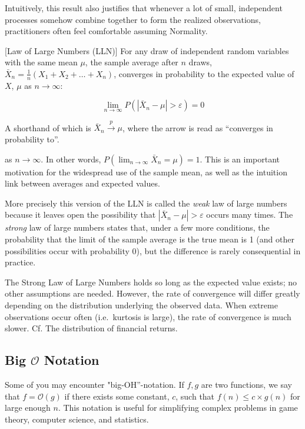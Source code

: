 \documentclass[]{book}
\theoremstyle{definition}
\theoremstyle{definition}
\theoremstyle{definition}
\theoremstyle{remark}
\begin{document}
Intuitively, this result also justifies that whenever a lot of small, independent processes somehow combine together to form the realized observations, practitioners often feel comfortable assuming Normality.

[Law of Large Numbers (LLN)]
\protect\hypertarget{thm:lln}{}{\label{thm:lln} {} }For any draw of independent random variables with the same mean \(\mu\), the sample average after \(n\) draws, \(\bar{X}_n = \frac{1}{n}(X_1 + X_2 + \ldots + X_n)\), converges in probability to the expected value of \(X\), \(\mu\) as \(n \rightarrow \infty\):

\[\lim\limits_{n\to \infty} P(|\bar{X}_n - \mu | > \varepsilon) = 0\]

A shorthand of which is \(\bar{X}_n \xrightarrow{p} \mu\), where the arrow is read as ``converges in probability to''.

as \(n\to \infty\). In other words, \(P( \lim_{n\to\infty}\bar{X}_n = \mu) = 1\). This is an important motivation for the widespread use of the sample mean, as well as the intuition link between averages and expected values.

More precisely this version of the LLN is called the \emph{weak} law of large numbers because it leaves open the possibility that \(|\bar{X}_n - \mu | > \varepsilon\) occurs many times. The \emph{strong} law of large numbers states that, under a few more conditions, the probability that the limit of the sample average is the true mean is 1 (and other possibilities occur with probability 0), but the difference is rarely consequential in practice.

The Strong Law of Large Numbers holds so long as the expected value exists; no other assumptions are needed. However, the rate of convergence will differ greatly depending on the distribution underlying the observed data. When extreme observations occur often (i.e.~kurtosis is large), the rate of convergence is much slower. Cf. The distribution of financial returns.

\hypertarget{big-mathcalo-notation}{%
\subsection{\texorpdfstring{Big \(\mathcal{O}\) Notation}{Big \textbackslash{}mathcal\{O\} Notation}}\label{big-mathcalo-notation}}

Some of you may encounter "big-OH''-notation. If \(f, g\) are two functions, we say that \(f = \mathcal{O}(g)\) if there exists some constant, \(c\), such that \(f(n) \leq c \times g(n)\) for large enough \(n\). This notation is useful for simplifying complex problems in game theory, computer science, and statistics.
\end{document}
